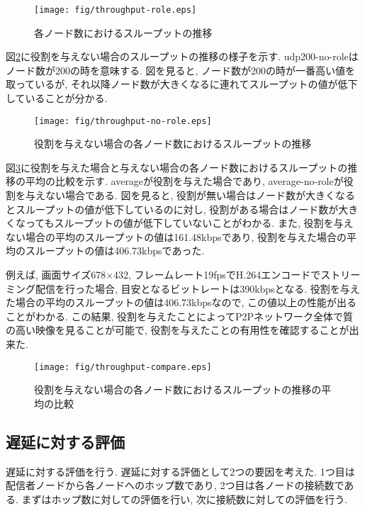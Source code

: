 \begin{figure}[h]
  \centering
  \texttt{[image: fig/throughput-role.eps]}
  \caption{各ノード数におけるスループットの推移}
  \label{fig:throughput-role}
\end{figure}

\newpage

図\ref{fig:throughput-no-role}に役割を与えない場合のスループットの推移の様子を示す. udp200-no-roleはノード数が200の時を意味する. 図を見ると, ノード数が200の時が一番高い値を取っているが, それ以降ノード数が大きくなるに連れてスループットの値が低下していることが分かる.

\begin{figure}[h]
  \centering
  \texttt{[image: fig/throughput-no-role.eps]}
  \caption{役割を与えない場合の各ノード数におけるスループットの推移}
  \label{fig:throughput-no-role}
\end{figure}

\newpage

図\ref{fig:throughput-compare}に役割を与えた場合と与えない場合の各ノード数におけるスループットの推移の平均の比較を示す. averageが役割を与えた場合であり, average-no-roleが役割を与えない場合である. 図を見ると, 役割が無い場合はノード数が大きくなるとスループットの値が低下しているのに対し, 役割がある場合はノード数が大きくなってもスループットの値が低下していないことがわかる. また, 役割を与えない場合の平均のスループットの値は161.48kbpsであり, 役割を与えた場合の平均のスループットの値は406.73kbpsであった.

例えば, 画面サイズ678×432, フレームレート19fpsでH.264エンコードでストリーミング配信を行った場合, 目安となるビットレートは390kbpsとなる. 役割を与えた場合の平均のスループットの値は406.73kbpsなので, この値以上の性能が出ることがわかる. この結果, 役割を与えたことによってP2Pネットワーク全体で質の高い映像を見ることが可能で, 役割を与えたことの有用性を確認することが出来た.

\newpage

\begin{figure}[h]
  \centering
  \texttt{[image: fig/throughput-compare.eps]}
  \caption{役割を与えない場合の各ノード数におけるスループットの推移の平均の比較}
  \label{fig:throughput-compare}
\end{figure}

\subsection{遅延に対する評価}\label{subsec:eval-delay}
遅延に対する評価を行う. 遅延に対する評価として2つの要因を考えた. 1つ目は配信者ノードから各ノードへのホップ数であり, 2つ目は各ノードの接続数である. まずはホップ数に対しての評価を行い, 次に接続数に対しての評価を行う.

